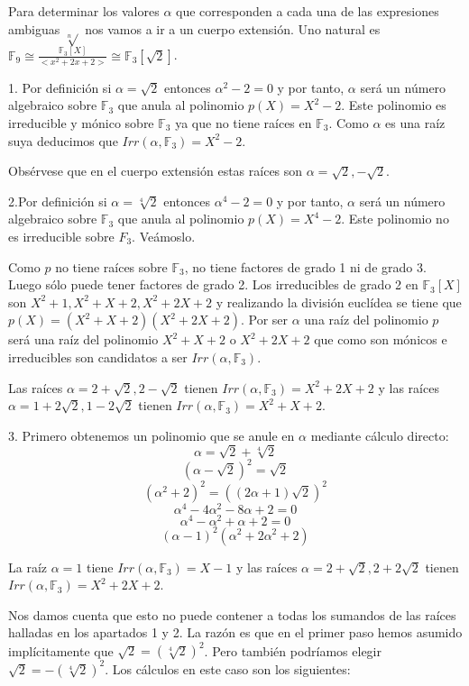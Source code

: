 Para determinar los valores $\alpha$ que corresponden a cada una de las expresiones ambiguas $\sqrt[n]{}$ nos vamos a ir a un cuerpo extensión. Uno natural es $ \mathbb{F}_9 \cong \frac{\mathbb{F}_3[X]}{<x^2+2x+2>} \cong \mathbb{F}_3[\sqrt{2}]$.

1. Por definición si $\alpha = \sqrt{2}$ entonces $\alpha^2 - 2 = 0$ y por tanto, $\alpha$ será un número algebraico sobre $\mathbb{F}_3$ que anula al polinomio $p(X) = X^2-2$. Este polinomio es irreducible y mónico sobre $\mathbb{F}_3$ ya que no tiene raíces en $\mathbb{F}_3$.  Como $\alpha$ es una raíz suya deducimos que $Irr(\alpha,\mathbb{F}_3) = X^2-2$.

Obsérvese que en el cuerpo extensión estas raíces son $\alpha = \sqrt{2},-\sqrt{2}$. 

2.Por definición si $\alpha = \sqrt[4]{2}$ entonces $\alpha^4 - 2 = 0$ y por tanto, $\alpha$ será un número algebraico sobre $\mathbb{F}_3$ que anula al polinomio $p(X) = X^4-2$. Este polinomio no es irreducible sobre $F_3$. Veámoslo.

Como $p$ no tiene raíces sobre $\mathbb{F}_3$, no tiene factores de grado 1 ni de grado 3. Luego sólo puede tener factores de grado 2. Los irreducibles de grado 2 en $\mathbb{F}_3[X]$ son $X^2+1,X^2+X+2,X^2+2X+2$ y realizando la división euclídea se tiene que $p(X) = (X^2+X+2)(X^2+2X+2)$. Por ser $\alpha$ una raíz del polinomio $p$ será una raíz del polinomio $X^2+X+2$ o $X^2+2X+2$ que como son mónicos e irreducibles son candidatos a ser $Irr(\alpha,\mathbb{F}_3)$.

 Las raíces $\alpha = 2+\sqrt{2},2-\sqrt{2}$ tienen $Irr(\alpha,\mathbb{F}_3) = X^2+2X+2$ y las raíces $\alpha = 1 + 2\sqrt{2}, 1-2\sqrt{2}$ tienen $Irr(\alpha,\mathbb{F}_3) = X^2+X+2$.


3. Primero obtenemos un polinomio que se anule en $\alpha$ mediante cálculo directo: $$\alpha = \sqrt{2}+\sqrt[4]{2}$$ $$(\alpha - \sqrt{2})^2 = \sqrt{2}$$ $$(\alpha^2+2)^2 = ((2 \alpha + 1) \sqrt{2})^2$$ $$\alpha^4 - 4 \alpha^2 - 8 \alpha + 2 = 0$$ $$\alpha^4 - \alpha^2 + \alpha + 2 = 0$$ $$(\alpha-1)^2(\alpha^2+2\alpha^2+2)$$

La raíz $\alpha = 1$ tiene $Irr(\alpha,\mathbb{F}_3) = X-1$ y las raíces $\alpha = 2+\sqrt{2},2+2\sqrt{2}$ tienen $Irr(\alpha,\mathbb{F}_3) = X^2+2X+2$. 

Nos damos cuenta que esto no puede contener a todas los sumandos de las raíces halladas en los apartados 1 y 2. La razón es que en el primer paso hemos asumido implícitamente que $\sqrt{2} = (\sqrt[4]{2})^2$. Pero también podríamos elegir $\sqrt{2} = - (\sqrt[4]{2})^2$. Los cálculos en este caso son  los siguientes:

